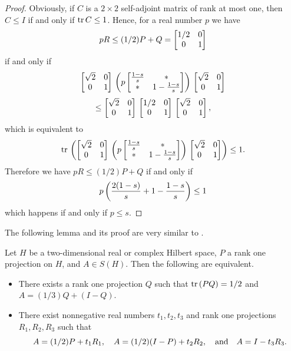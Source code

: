 \documentclass{article}
\begin{document}
\begin{proof}
Obviously, if $C$ is a $2\times 2$ self-adjoint matrix of rank at most one, then $C \le I$ if and only if ${\rm tr}\, C \le 1$. Hence, for a real number $p$ we have
$$
pR \le (1/2)P + Q =  \left[ \begin{matrix} 1/2 & 0 \cr 0 & 1 \cr \end{matrix} \right]
$$
if and only if
$$
 \left[ \begin{matrix} \sqrt{2}  & 0 \cr 0 & 1 \cr \end{matrix} \right] \, \left( p \left[ \begin{matrix} {1-s \over s} & * \cr * & 1-  {1-s \over s} \cr \end{matrix} \right] \right) \,  \left[ \begin{matrix} \sqrt{2}  & 0 \cr 0 & 1 \cr \end{matrix} \right]
$$
$$
\le  \left[ \begin{matrix} \sqrt{2}  & 0 \cr 0 & 1 \cr \end{matrix} \right] \,              \left[ \begin{matrix} 1/2 & 0 \cr 0 & 1 \cr \end{matrix} \right]          \, \left[ \begin{matrix} \sqrt{2}  & 0 \cr 0 & 1 \cr \end{matrix} \right] ,
$$
which is equivalent to
$$
{\rm tr}\, \left( \left[ \begin{matrix} \sqrt{2}  & 0 \cr 0 & 1 \cr \end{matrix} \right] \, \left( p \left[ \begin{matrix} {1-s \over s} & * \cr * & 1-  {1-s \over s} \cr \end{matrix} \right] \right) \,  \left[ \begin{matrix} \sqrt{2}  & 0 \cr 0 & 1 \cr \end{matrix} \right] \right) \le 1.
$$
Therefore we have $pR \le (1/2)P + Q$ if and only if
$$
p \left( { 2 (1-s) \over s} + 1-  {1-s \over s} \right) \le 1
$$
which happens if and only if $p \le s$.
\end{proof}

The following lemma and its proof are very similar to \cite[Lemma 3.44]{MS1}.

\begin{lemma}\label{chrono}
Let $H$ be a two-dimensional real or complex Hilbert space, $P$ a rank one projection on $H$, and $A \in S(H)$. Then the following are equivalent.
\begin{itemize}
\item There exists a rank one projection $Q$ such that ${\rm tr}\, (PQ)= 1/2$ and $A = (1/3)Q + (I-Q)$. 
\item There exist nonnegative real numbers $t_1 , t_2 , t_3$ and rank one projections $R_1 , R_2 , R_3$ such that
$$
A = (1/2)P + t_1 R_1 , \ \ \ A = (1/2)(I-P) + t_2 R_2 , \ \ \ {\rm and} \ \ \ A = I- t_3 R_3.  
$$ 
\end{itemize}  
\end{lemma}
\end{document}

